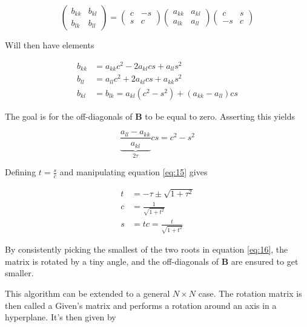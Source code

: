 \documentclass[a4paper,11pt]{article}
\begin{document}
\begin{equation}\label{eq:14}
    \begin{pmatrix}
    b_{kk} & b_{kl} \\
    b_{lk} & b_{ll}
    \end{pmatrix}
    = 
    \begin{pmatrix}
    c & -s \\ 
    s & c 
    \end{pmatrix}
    \begin{pmatrix}
    a_{kk} & a_{kl} \\
    a_{lk} & a_{ll}
    \end{pmatrix}
    \begin{pmatrix}
    c & s\\
    -s & c
    \end{pmatrix}
\end{equation}

Will then have elements 

\begin{align*}
    b_{kk} &= a_{kk}c^2 -2a_{kl}cs + a_{ll}s^2 \\
    b_{ll} &= a_{ll}c^2 + 2a_{kl}cs + a_{kk}s^2 \\
    b_{kl} &=b_{lk} = a_{kl}(c^2-s^2) + (a_{kk} - a_{ll})cs 
\end{align*}

The goal is for the off-diagonals of $\mathbf B$ to be equal to zero. Asserting this yields 

\begin{equation}\label{eq:15}
    \underbrace{\frac{a_{ll} - a_{kk}}{a_{kl}}}_{2\tau} cs = c^2-s^2
\end{equation}

Defining $t = \frac{s}{c}$ and manipulating equation \ref{eq:15} gives 

\begin{align}
t &= -\tau \pm \sqrt{1+\tau^2}\label{eq:16} \\
c &= \frac{1}{\sqrt{1+t^2}}\label{eq:17} \\
s &= tc = \frac{t}{\sqrt{1+t^2}}\label{eq:18}
\end{align}

By consistently picking the smallest of the two roots in equation \ref{eq:16}, the matrix is rotated by a tiny angle, and the off-diagonals of $\mathbf B$ are ensured to get smaller. 

This algorithm can be extended to a general $N\times N$ case. The rotation matrix is then called a Given's matrix and performs a rotation around an axis in a hyperplane. It's then given by \cite{notes}
\end{document}
